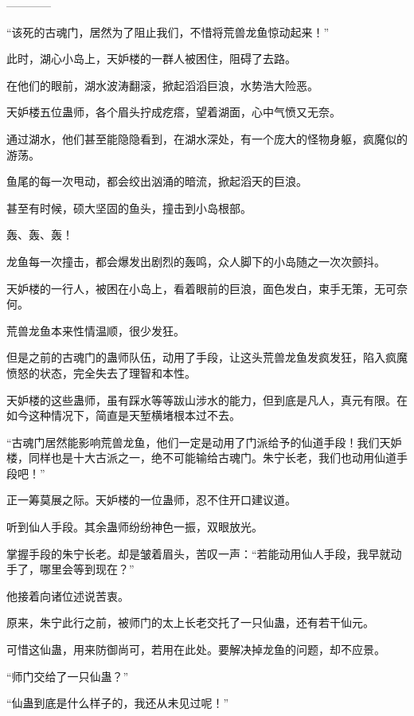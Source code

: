 
\begin{this_body}

------------

“该死的古魂门，居然为了阻止我们，不惜将荒兽龙鱼惊动起来！”

此时，湖心小岛上，天妒楼的一群人被困住，阻碍了去路。

在他们的眼前，湖水波涛翻滚，掀起滔滔巨浪，水势浩大险恶。

天妒楼五位蛊师，各个眉头拧成疙瘩，望着湖面，心中气愤又无奈。

通过湖水，他们甚至能隐隐看到，在湖水深处，有一个庞大的怪物身躯，疯魔似的游荡。

鱼尾的每一次甩动，都会绞出汹涌的暗流，掀起滔天的巨浪。

甚至有时候，硕大坚固的鱼头，撞击到小岛根部。

轰、轰、轰！

龙鱼每一次撞击，都会爆发出剧烈的轰鸣，众人脚下的小岛随之一次次颤抖。

天妒楼的一行人，被困在小岛上，看着眼前的巨浪，面色发白，束手无策，无可奈何。

荒兽龙鱼本来性情温顺，很少发狂。

但是之前的古魂门的蛊师队伍，动用了手段，让这头荒兽龙鱼发疯发狂，陷入疯魔愤怒的状态，完全失去了理智和本性。

天妒楼的这些蛊师，虽有踩水等等跋山涉水的能力，但到底是凡人，真元有限。在如今这种情况下，简直是天堑横堵根本过不去。

“古魂门居然能影响荒兽龙鱼，他们一定是动用了门派给予的仙道手段！我们天妒楼，同样也是十大古派之一，绝不可能输给古魂门。朱宁长老，我们也动用仙道手段吧！”

正一筹莫展之际。天妒楼的一位蛊师，忍不住开口建议道。

听到仙人手段。其余蛊师纷纷神色一振，双眼放光。

掌握手段的朱宁长老。却是皱着眉头，苦叹一声：“若能动用仙人手段，我早就动手了，哪里会等到现在？”

他接着向诸位述说苦衷。

原来，朱宁此行之前，被师门的太上长老交托了一只仙蛊，还有若干仙元。

可惜这仙蛊，用来防御尚可，若用在此处。要解决掉龙鱼的问题，却不应景。

“师门交给了一只仙蛊？”

“仙蛊到底是什么样子的，我还从未见过呢！”


\end{this_body}
